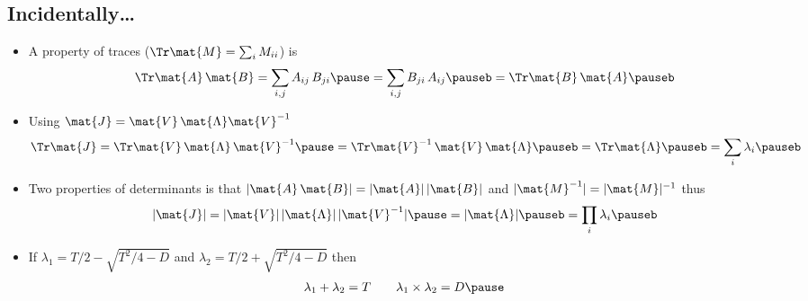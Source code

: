 
\begin{slide}
\section[-2]{Incidentally\ldots}

\begin{PauseHighLight}\small
  \begin{itemize}
  \item A property of traces ($\Tr \mat{M} = \sum_i M_{ii}$) is\vspace*{-0.3cm}
    \begin{align*}
      \Tr \mat{A}\,\mat{B} = \sum_{i,j} A_{ij}\,B_{ji} \pause= \sum_{i,j}
      B_{ji}\,A_{ij} \pauseb= \Tr \mat{B} \, \mat{A}\pauseb
    \end{align*}\vspace*{-1cm}
  \item Using $\mat{J} = \mat{V}\,\mat{\Lambda}\mat{V}^{-1}$\vspace*{-0.3cm}
    \begin{align*}
      \Tr \mat{J} = \Tr \mat{V}\,\mat{\Lambda}\,\mat{V}^{-1} \pause
      = \Tr \mat{V}^{-1}\,\mat{V}\,\mat{\Lambda} \pauseb
      = \Tr \mat{\Lambda}\pauseb =  \sum_i \lambda_i\pauseb
    \end{align*}\vspace*{-1cm}
  \item Two properties of determinants is that $|\mat{A}\,\mat{B}| =
    |\mat{A}|\,|\mat{B}|$ and $|\mat{M}^{-1}| = |\mat{M}|^{-1}$ thus\vspace*{-0.3cm}
    \begin{align*}
      |\mat{J}|= |\mat{V}|\,|\mat{\Lambda}|\,|\mat{V}^{-1}|\pause =
      |\mat{\Lambda}|\pauseb = \prod_i \lambda_i\pauseb
    \end{align*}\vspace*{-1cm}
  \item If $\lambda_{1} = T/2 - \sqrt{T^{2}/4-D}$ and $\lambda_2=T/2
    + \sqrt{T^{2}/4-D}$ then\vspace*{-0.3cm}
    \begin{align*}
      \lambda_{1} + \lambda_{2} &= T
      &&&
      \lambda_{1} \times \lambda_{2} = D\pause
    \end{align*}
  \end{itemize}
\end{PauseHighLight}

\end{slide}


